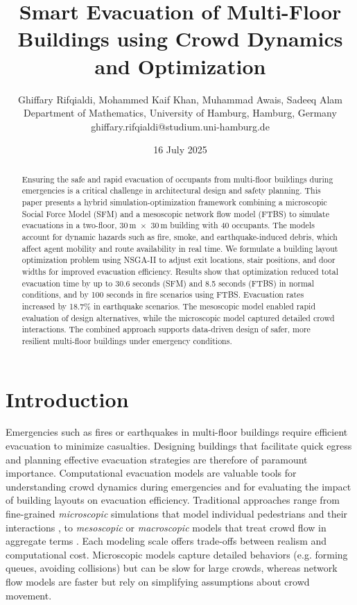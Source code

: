 \documentclass[11pt,a4paper]{article}
\title{Smart Evacuation of Multi-Floor Buildings using Crowd Dynamics and Optimization}
\author{Ghiffary Rifqialdi, Mohammed Kaif Khan, Muhammad Awais, Sadeeq Alam\\[1ex] \normalsize Department of Mathematics, University of Hamburg, Hamburg, Germany\\ \normalsize ghiffary.rifqialdi@studium.uni-hamburg.de}
\date{16 July 2025}
\begin{document}
\maketitle

\begin{abstract}
Ensuring the safe and rapid evacuation of occupants from multi-floor buildings during emergencies is a critical challenge in architectural design and safety planning. This paper presents a hybrid simulation-optimization framework combining a microscopic Social Force Model (SFM) and a mesoscopic network flow model (FTBS) to simulate evacuations in a two-floor, 30\,m~$\times$~30\,m building with 40 occupants. The models account for dynamic hazards such as fire, smoke, and earthquake-induced debris, which affect agent mobility and route availability in real time. We formulate a building layout optimization problem using NSGA-II to adjust exit locations, stair positions, and door widths for improved evacuation efficiency. Results show that optimization reduced total evacuation time by up to 30.6 seconds (SFM) and 8.5 seconds (FTBS) in normal conditions, and by 100 seconds in fire scenarios using FTBS. Evacuation rates increased by 18.7\% in earthquake scenarios. The mesoscopic model enabled rapid evaluation of design alternatives, while the microscopic model captured detailed crowd interactions. The combined approach supports data-driven design of safer, more resilient multi-floor buildings under emergency conditions.
\end{abstract}

\section{Introduction}
Emergencies such as fires or earthquakes in multi-floor buildings require efficient evacuation to minimize casualties. Designing buildings that facilitate quick egress and planning effective evacuation strategies are therefore of paramount importance. Computational evacuation models are valuable tools for understanding crowd dynamics during emergencies and for evaluating the impact of building layouts on evacuation efficiency. Traditional approaches range from fine-grained \textit{microscopic} simulations that model individual pedestrians and their interactions \cite{helbing1995}, to \textit{mesoscopic} or \textit{macroscopic} models that treat crowd flow in aggregate terms \cite{Kuligowski2010}. Each modeling scale offers trade-offs between realism and computational cost. Microscopic models capture detailed behaviors (e.g. forming queues, avoiding collisions) but can be slow for large crowds, whereas network flow models are faster but rely on simplifying assumptions about crowd movement.
\end{document}
